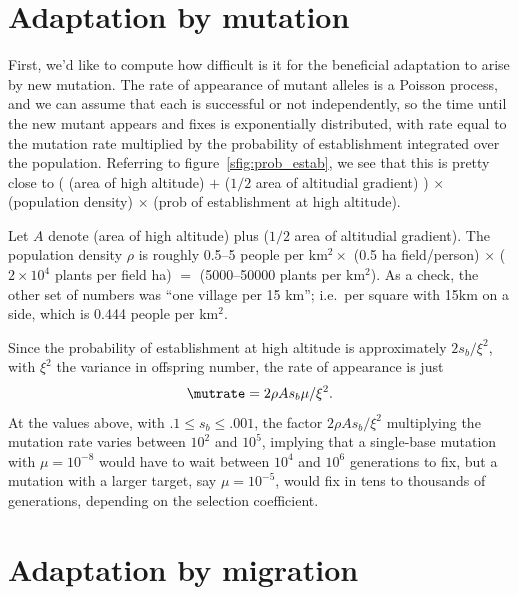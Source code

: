 \section{Adaptation by mutation}


First, we'd like to compute how difficult is it for the beneficial adaptation to arise by new mutation.
The rate of appearance of mutant alleles is a Poisson process,
and we can assume that each is successful or not independently,
so the time until the new mutant appears and fixes is exponentially distributed,
with rate equal to the mutation rate multiplied by the probability of establishment integrated over the population.
Referring to figure~\ref{sfig:prob_estab},
we see that this is pretty close to ( (area of high altitude) $+$ ($1/2$ area of altitudial gradient) ) $\times$ (population density) $\times$ (prob of establishment at high altitude).

Let $A$ denote (area of high altitude) plus ($1/2$ area of altitudial gradient).
The population density $\rho$ is roughly 0.5--5 people per km$^2 \times$ (0.5 ha field/person) $\times$ ($2\times10^4$ plants per field ha) $=$ (5000--50000 plants per km$^2$).
As a check, the other set of numbers was ``one village per 15 km''; i.e.\ per square with 15km on a side, which is 0.444 people per km$^2$.

Since the probability of establishment at high altitude is approximately $2 s_b / \xi^2$, 
with $\xi^2$ the variance in offspring number,
the rate of appearance is just 
\begin{align*}
  \mutrate = 2 \rho A s_b \mu / \xi^2 .
\end{align*}
At the values above, with $.1 \le s_b \le .001$, the factor $2 \rho A s_b / \xi^2$ multiplying the mutation rate
varies between $10^2$ and $10^5$,
implying that a single-base mutation with $\mu=10^{-8}$ would have to wait between $10^4$ and $10^6$ generations to fix,
but a mutation with a larger target, say $\mu=10^{-5}$, would fix in tens to thousands of generations, depending on the selection coefficient.



\section{Adaptation by migration}

